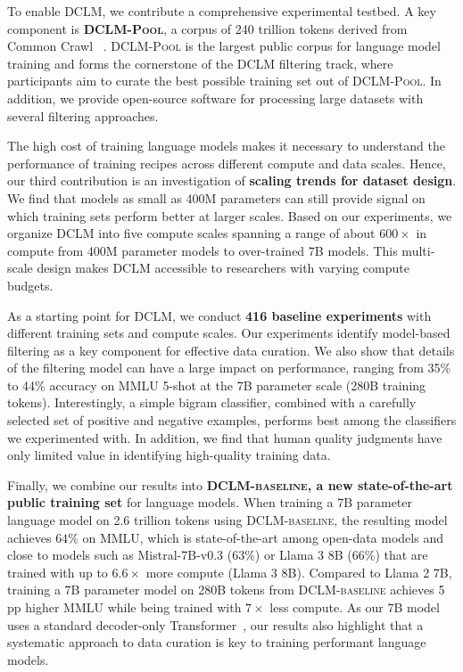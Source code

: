 To enable DCLM, we contribute a comprehensive experimental testbed. A key component is \textbf{\textsc{DCLM-Pool}}, a corpus of 240 trillion tokens derived from Common Crawl ~\citep{commoncrawl}.
\textsc{DCLM-Pool} is the largest public corpus for language model training and forms the cornerstone of the DCLM filtering track, where participants aim to curate the best possible training set out of \textsc{DCLM-Pool}.
In addition, we provide open-source software for processing large datasets with several filtering approaches.

The high cost of training language models makes it necessary to understand the performance of training recipes across different compute and data scales. Hence, our third contribution is an investigation of \textbf{scaling trends for dataset design}. We find that models as small as 400M parameters can still provide signal on which training sets perform better at larger scales. Based on our experiments, we organize \textsc{DCLM} into five compute scales spanning a range of about $600\times$ in compute from 400M parameter models to over-trained 7B models. This multi-scale design makes \textsc{DCLM} accessible to researchers with varying compute budgets.

As a starting point for \textsc{DCLM}, we conduct \textbf{416 baseline experiments} with different training sets and compute scales. Our experiments identify model-based filtering as a key component for effective data curation. We also show that details of the filtering model can have a large impact on performance, ranging from 35\% to 44\% accuracy on MMLU 5-shot \citep{hendrycks2020measuring} at the 7B parameter scale (280B training tokens). Interestingly, a simple bigram classifier, combined with a carefully selected set of positive and negative examples, performs best among the classifiers we experimented with. In addition, we find that human quality judgments have only limited value in identifying high-quality training data.

Finally, we combine our results into \textbf{\textsc{DCLM-baseline}, a new state-of-the-art public training set} for language models. When training a 7B parameter language model on 2.6 trillion tokens using \textsc{DCLM-baseline}, the resulting model achieves $64$\% on MMLU, which is state-of-the-art among open-data models and close to models such as Mistral-7B-v0.3 (63\%) or Llama 3 8B (66\%) that are trained with up to $6.6\times$ more compute (Llama 3 8B). Compared to Llama 2 7B, training a 7B parameter model on 280B tokens from \textsc{DCLM-baseline} achieves 5 pp higher MMLU while being trained with $7 \times$ less compute. As our 7B model uses a standard decoder-only Transformer~\citep{transformer,Radford2019LanguageMA,llama}, our results also highlight that a systematic approach to data curation is key to training performant language models.

